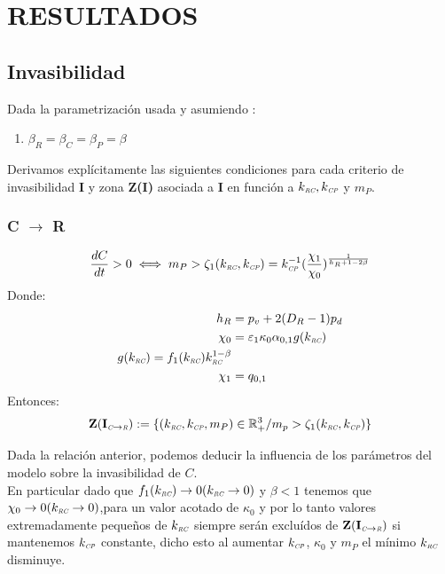 \section{RESULTADOS}


\subsection{Invasibilidad}
Dada la parametrizaci\'on usada y asumiendo :
\begin{enumerate}
\item $\beta_R = \beta_C = \beta_P = \beta$
\end{enumerate}

Derivamos expl\'icitamente las siguientes condiciones para cada criterio de invasibilidad \textbf{I} y zona \textbf{Z(I)} asociada a \textbf{I} en funci\'on a $k_{\textit{\tiny RC}},k_{\textit{\tiny CP}}$ y $m_P$.

\subsubsection{C $\to$ R}

\begin{equation}
  \frac{dC}{dt} >0 \iff  m_P > \zeta_1(k_{\textit{\tiny RC}},k_{\textit{\tiny CP}}) = k_{\textit{\tiny CP}}^{-1}(\frac{\chi_1}{\chi_0})^{\frac{1}{h_R +1 - 2\beta }}
\end{equation}
Donde:
\begin{equation}
  \begin{aligned}
    h_R &= p_v + 2(D_R - 1)p_d \\
    \chi_0 &= \varepsilon_1 \kappa_0\alpha_{0,1} g(k_{\textit{\tiny RC}}) \\
    g(k_{\textit{\tiny RC}}) = f_1(k_{\textit{\tiny RC}})k_{\textit{\tiny RC}}^{1-\beta}\\
    \chi_1 &= q_{0,1} 
  \end{aligned}
\end{equation}
Entonces:
\begin{equation}
\mathbf{Z(I_{\textit{\tiny C}\to \textit{\tiny R}})} := \{ (k_{\textit{\tiny RC}},k_{\textit{\tiny CP}},m_P) \in \mathbb{R}^3_+ / m_p > \zeta_1(k_{\textit{\tiny RC}},k_{\textit{\tiny CP}}) \}
\end{equation}


Dada la relaci\'on anterior, podemos deducir la influencia de los par\'ametros del modelo sobre la invasibilidad de $C$.\\

En particular dado que $f_1(k_{\textit{\tiny RC}}) \to 0 (k_{\textit{\tiny RC}} \to 0)$ y $\beta <1$ tenemos que $\chi_0 \to 0 (k_{\textit{\tiny RC}} \to 0)$,para un valor acotado de $\kappa_0$ y por lo tanto valores extremadamente peque\~nos de $k_{\textit{\tiny RC}}$ siempre ser\'an exclu\'idos de $\mathbf{Z(I_{\textit{\tiny C}\to \textit{\tiny R}})}$ si mantenemos $k_{\textit{\tiny CP}}$ constante, dicho esto al aumentar $k_{\textit{\tiny CP}}$, $\kappa_0$ y $m_P$ el m\'inimo $k_{\textit{\tiny RC}}$ disminuye. \\

